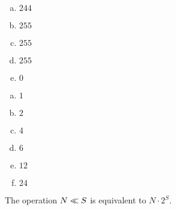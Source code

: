 \begin{Answer}[ref={bitnot}]
  \begin{enumerate}[(a)]
  \item $244$
  \item $255$
  \item $255$
  \item $255$
  \item $0$
  \end{enumerate}
\end{Answer}

\begin{Answer}[ref={bit-equiv}]

  \begin{enumerate}[(a)]
  \item $1$
  \item $2$
  \item $4$
  \item $6$
  \item $12$
  \item $24$
  \end{enumerate}

  The operation $N \ll S$ is equivalent to $N \cdot 2^S$.

\end{Answer}

